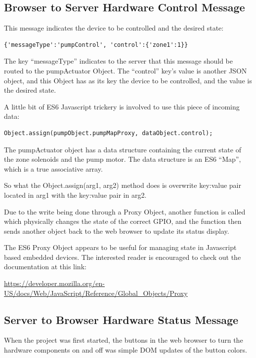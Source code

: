 \subsection{Browser to Server Hardware Control Message}

This message indicates the device to be controlled and the desired state:

\begin{verbatim}
{'messageType':'pumpControl', 'control':{'zone1':1}}
\end{verbatim}

The key ``messageType'' indicates to the server that this message should be 
routed to the pumpActuator Object.  The ``control'' key's value is another JSON 
object, and this Object has as its key the device to be controlled, and the 
value is the desired state.

A little bit of ES6 Javascript trickery is involved to use this piece of 
incoming data:

\begin{verbatim}
Object.assign(pumpObject.pumpMapProxy, dataObject.control);
\end{verbatim}

The pumpActuator object has a data structure containing the current state of 
the zone solenoids and the pump motor.  The data structure is an ES6 ``Map'', 
which is a true associative array.

So what the Object.assign(arg1, arg2) method does is overwrite key:value pair 
located in arg1 with the key:value pair in arg2.

Due to the write being done through a Proxy Object, another function is called 
which physically changes the state of the correct GPIO, and the function then 
sends another object back to the web browser to update its status display.

The ES6 Proxy Object appears to be useful 
for managing state in Javascript based embedded devices.  The interested reader 
is encouraged to check out the documentation at this link:

\url{https://developer.mozilla.org/en-US/docs/Web/JavaScript/Reference/Global_Objects/Proxy}

\subsection{Server to Browser Hardware Status Message}

When the project was first started, the buttons in the web browser to turn the 
hardware components on and off was simple DOM updates of the button colors.

